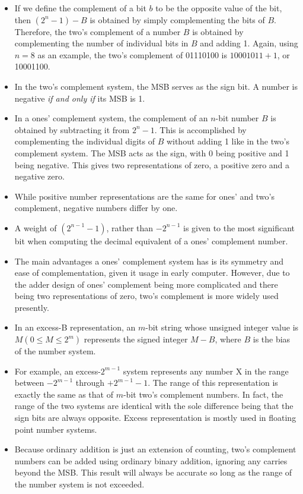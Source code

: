 \documentclass[10pt,a4paper]{article}
\begin{document}
\begin{itemize}
\item If we define the complement of a bit $b$ to be the opposite value of the bit, then $(2^n-1)-B$ is obtained by simply complementing the bits of $B$. Therefore, the two's complement of a number $B$ is obtained by complementing the number of individual bits in $B$ and adding 1. Again, using $n=8$ as an example, the two's complement of 01110100 is $10001011+1$, or 10001100. 
\item In the two's complement system, the MSB serves as the sign bit. A number is negative \textit{if and only if} its MSB is 1. 
\item In a ones' complement system, the complement of an $n$-bit number $B$ is obtained by subtracting it from $2^n-1$. This is accomplished by complementing the individual digits of $B$ without adding 1 like in the two's complement system. The MSB acts as the sign, with 0 being positive and 1 being negative. This gives two representations of zero, a positive zero and a negative zero. 
\item While positive number representations are the same for ones' and two's complement, negative numbers differ by one. 
\item A weight of $(2^{n-1}-1)$, rather than $-2^{n-1}$ is given to the most significant bit when computing the decimal equivalent of a ones' complement number. 
\item The main advantages a ones' complement system has is its symmetry and ease of complementation, given it usage in early computer. However, due to the adder design of ones' complement being more complicated and there being two representations of zero, two's complement is more widely used presently. 
\item In an excess-B representation, an $m$-bit string whose unsigned integer value is $M(0\leq M\leq2^m)$ represents the signed integer $M-B$, where $B$ is the bias of the number system.
\item For example, an excess-$2^{m-1}$ system represents any number X in the range between $-2^{m-1}$ through $+2^{m-1}-1$.  The range of this representation is exactly the same as that of $m$-bit two's complement numbers. In fact, the range of the two systems are identical with the sole difference being that the sign bits are always opposite. Excess representation is mostly used in floating point number systems. 
\item Because ordinary addition is just an extension of counting, two's complement numbers can be added using ordinary binary addition, ignoring any carries beyond the MSB. This result will always be accurate so long as the range of the number system is not exceeded. 

\end{itemize}
\end{document}
